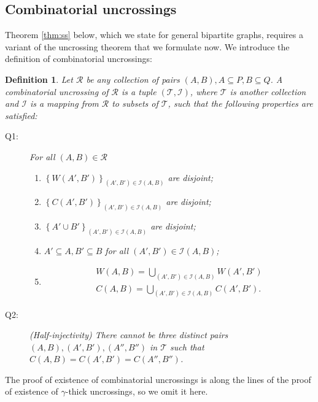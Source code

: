 \documentclass[11pt]{article}
\newtheorem{definition}[theorem]{Definition}
\newcommand{\coll}{{\mathcal R}}
\newcommand{\colltwo}{{\mathcal T}}
\begin{document}
\subsection{Combinatorial uncrossings}  
Theorem \ref{thm:ss} below, which we state for general bipartite graphs, requires a variant of the uncrossing theorem that we formulate now. We introduce the definition of combinatorial uncrossings:
\begin{definition}
\label{define:comp-uncross}
Let $\coll$ be any collection of pairs $(A, B), A\subseteq P, B\subseteq Q$. A combinatorial uncrossing of $\coll$ is a tuple $(\colltwo, \mathcal{I})$, where $\colltwo$ is another collection and $\mathcal{I}$ is a mapping from $\coll$ to subsets of $\colltwo$, such that the following properties are satisfied: 
\begin{description}
\item[Q1:] For all $(A, B)\in \coll$
\begin{enumerate}
\item $\left\lbrace W(A', B')\right\rbrace_{(A', B')\in \mathcal{I}(A, B)}$ are disjoint;
\item $\left\lbrace C(A', B')\right\rbrace_{(A', B')\in \mathcal{I}(A, B)}$ are disjoint;
\item $\left\lbrace A'\cup B'\right\rbrace_{(A', B')\in \mathcal{I}(A, B)}$ are disjoint;
\item $A'\subseteq A, B'\subseteq B$ for all $(A', B')\in \mathcal{I}(A, B)$;
\item 
\begin{equation*}
\begin{split}
W(A, B)=\bigcup_{(A', B')\in \mathcal{I}(A, B)} W(A', B')\\
C(A, B)=\bigcup_{(A', B')\in \mathcal{I}(A, B)} C(A', B').
\end{split}
\end{equation*}
\end{enumerate}
\item[Q2:](Half-injectivity) There cannot be three distinct pairs $(A, B), (A', B'), (A'', B'')$ in $\colltwo$ such that $C(A, B)=C(A', B')=C(A'', B'')$.
\end{description}
\end{definition}
The proof of existence of combinatorial uncrossings is along the lines of the proof of existence of $\gamma$-thick uncrossings, so we omit it here.
\end{document}
